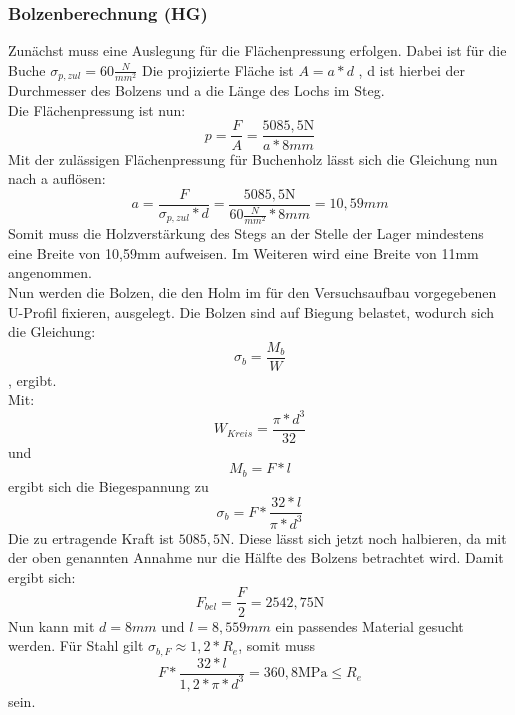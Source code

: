 

\subsubsection{Bolzenberechnung (HG)}
Zunächst muss eine Auslegung für die Flächenpressung erfolgen. Dabei ist für die Buche $\sigma_{p,zul}=60\frac{N}{mm^2}$
Die projizierte Fläche ist $A=a*d$ , d ist hierbei der Durchmesser des Bolzens und a die Länge des Lochs im Steg.\\
Die Flächenpressung ist nun: 
\begin{equation}
	p=\frac{F}{A}=\frac{5085,5\mathrm{N}}{a*8mm}
\end{equation}
Mit der zulässigen Flächenpressung für Buchenholz lässt sich die Gleichung nun nach a auflösen:
\begin{equation}
	a=\frac{F}{\sigma_{p,zul}*d}=\frac{5085,5\mathrm{N}}{60\frac{N}{mm^{2}}*8mm}=10,59mm
\end{equation}
Somit muss die Holzverstärkung des Stegs an der Stelle der Lager mindestens eine Breite von 10,59$\mathrm{mm}$ aufweisen. Im Weiteren wird eine Breite von 11$\mathrm{mm}$ angenommen.\\
 
Nun werden die Bolzen, die den Holm im für den Versuchsaufbau vorgegebenen U-Profil fixieren, ausgelegt. Die Bolzen sind auf Biegung belastet, wodurch sich die Gleichung:
\begin{equation}
	\sigma_{b}=\frac{M_{b}}{W} 
\end{equation}
, ergibt.\\
 Mit: 
 \begin{equation}
 	W_{Kreis}=\frac{\pi*d^{3}}{32}
 \end{equation}
 und 
 \begin{equation}
 	M_{b}=F*l
 \end{equation}
 ergibt sich die Biegespannung zu
 \begin{equation}
 \label{Biegespannung}
 	\sigma_{b}=F*\frac{32*l}{\pi*d^{3}}
 \end{equation}
Die zu ertragende Kraft ist $5085,5 \mathrm{N}$. Diese lässt sich jetzt noch halbieren, da mit der oben genannten Annahme nur die Hälfte des Bolzens betrachtet wird. Damit ergibt sich:
 \begin{equation}
 	F_{bel}=\frac{F}{2} =2542,75 \mathrm{N}
 \end{equation}
 Nun kann mit $d=8mm$ und $l=8,559mm$ ein passendes Material gesucht werden. Für Stahl gilt $\sigma_{b,F}\approx1,2*R_{e}$, somit muss 
 \begin{equation}
 	F*\frac{32*l}{1,2*\pi*d^{3}}=360,8\mathrm{MPa}\leq
R_{e} \end{equation}  sein.\\

